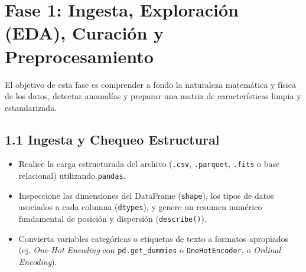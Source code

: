 \documentclass[11pt,a4paper]{article}
\begin{document}
\section{Fase 1: Ingesta, Exploración (EDA), Curación y Preprocesamiento}
\label{sec:fase1}

\begin{fasebox}
El objetivo de esta fase es comprender a fondo la naturaleza matemática y física de los datos, detectar anomalías y preparar una matriz de características limpia y estandarizada.
\end{fasebox}

\subsection{1.1 Ingesta y Chequeo Estructural}
\begin{itemize}[leftmargin=*,itemsep=2pt]
    \item Realice la carga estructurada del archivo (\texttt{.csv}, \texttt{.parquet}, \texttt{.fits} o base relacional) utilizando \texttt{pandas}.
    \item Inspeccione las dimensiones del DataFrame (\texttt{shape}), los tipos de datos asociados a cada columna (\texttt{dtypes}), y genere un resumen numérico fundamental de posición y dispersión (\texttt{describe()}).
    \item Convierta variables categóricas o etiquetas de texto a formatos apropiados (ej. \textit{One-Hot Encoding} con \texttt{pd.get\_dummies} o \texttt{OneHotEncoder}, o \textit{Ordinal Encoding}).
\end{itemize}
\end{document}
